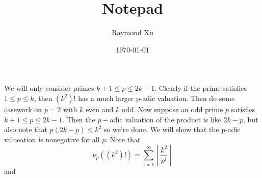 \documentclass[11pt]{scrartcl}
\theoremstyle{plain} %
\theoremstyle{definition}
\theoremstyle{remark}
\theoremstyle{empty}
\theoremstyle{empty}
\theoremstyle{empty}
\theoremstyle{empty}
\theoremstyle{empty}
\theoremstyle{empty}
\begin{document}



\title{Notepad}
\author{Raymond Xu}
\date{\today}
\maketitle

\begin{abstract}
\end{abstract}

\tableofcontents

\eject

\begin{problem}[2016 AMO 2]

\end{problem}

\begin{solution}
    We will only consider primes $k+1 \le p \le 2k-1$. Clearly if the prime satisfies $1 \le p \le k$, then $(k^2)!$ has a much larger p-adic valuation. Then do some casework on $p=2$ with $k$ even and $k$ odd. Now suppose an odd prime $p$ satisfies $k+1 \le p \le 2k-1$. Then the $p-$adic valuation of the product is like $2k-p$, but also note that $p(2k-p) \le k^2$ so we're done. 
    We will show that the p-adic valueation is nonegative for all $p$. Note that \[\nu_p((k^2)!) = \sum_{i=1}^\infty \left \lfloor \frac{k^2}{p^i} \right \rfloor\] and \[\]
\end{solution}


\begin{problem}[21 IMO 2]
    
\end{problem}

\begin{solution}
    
\end{solution}
\end{document}
